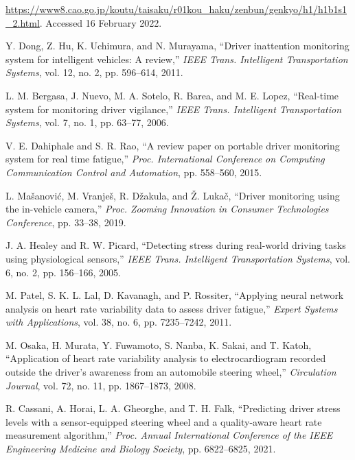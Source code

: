 \documentclass[honka]{nitkagawathesis}%
\begin{document}
\begin{thebibliography}{99}
    \url{https://www8.cao.go.jp/koutu/taisaku/r01kou_haku/zenbun/genkyo/h1/h1b1s1_2.html}. Accessed 16 February 2022.

  Y. Dong, Z. Hu, K. Uchimura, and N. Murayama, ``Driver inattention monitoring system for intelligent vehicles: A review,'' {\em IEEE Trans. Intelligent Transportation 
  Systems}, vol.           
  12, no. 2, pp. 596--614, 2011.

  L. M. Bergasa, J. Nuevo, M. A. Sotelo, R. Barea, and M. E. Lopez, ``Real-time system for monitoring driver vigilance,'' {\em IEEE Trans. Intelligent Transportation 
  Systems}, vol. 7, no. 
  1, pp. 63--77, 2006.

  V. E. Dahiphale and S. R. Rao, ``A review paper on portable driver monitoring system for real time fatigue,'' {\em Proc. International Conference on Computing 
  Communication 
  Control and Automation}, pp. 558--560, 2015.

  L. Ma\v{s}anovi\'{c}, M. Vranje\v{s}, R. D\v{z}akula, and \v{Z}. Luka\v{c}, ``Driver monitoring using the in-vehicle camera,'' {\em Proc. Zooming Innovation in 
  Consumer Technologies Conference}, pp. 
  33--38, 2019.

  J. A. Healey and R. W. Picard, ``Detecting stress during real-world driving tasks using physiological sensors,'' {\em IEEE Trans. Intelligent Transportation Systems}, 
  vol. 6, no. 2, pp. 156--166, 2005.

  M. Patel, S. K. L. Lal, D. Kavanagh, and P. Rossiter, ``Applying neural network analysis on heart rate variability data to assess driver fatigue,'' {\em Expert Systems 
  with Applications}, vol. 38, no. 6, pp. 7235--7242, 2011.

  M. Osaka, H. Murata, Y. Fuwamoto, S. Nanba, K. Sakai, and T. Katoh, ``Application of heart rate variability analysis to electrocardiogram recorded outside the driver's 
  awareness from an automobile steering wheel,'' {\em Circulation Journal}, vol. 72, no. 11, pp. 1867--1873, 2008.

  R. Cassani, A. Horai, L. A. Gheorghe, and T. H. Falk, ``Predicting driver stress levels with a sensor-equipped steering wheel and a quality-aware heart rate 
  measurement algorithm,'' {\em Proc. Annual International Conference of the IEEE Engineering Medicine and Biology Society}, pp. 6822--6825, 2021.


\end{thebibliography}
\end{document}
